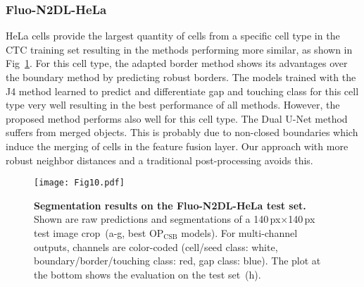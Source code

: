 \documentclass[10pt,letterpaper]{article}
\begin{document}
\subsubsection*{Fluo-N2DL-HeLa}
HeLa cells provide the largest quantity of cells from a specific cell type in the CTC training set resulting in the methods performing more similar, as shown in Fig~\ref{fig:fluo-n2dl-hela-results}. For this cell type, the adapted border method shows its advantages over the boundary method by predicting robust borders. The models trained with the J4 method learned to predict and differentiate gap and touching class for this cell type very well resulting in the best performance of all methods. However, the proposed method performs also well for this cell type. The Dual U-Net method suffers from merged objects. This is probably due to non-closed boundaries which induce the merging of cells in the feature fusion layer. Our approach with more robust neighbor distances and a traditional post-processing avoids this.
\begin{figure}
\begin{adjustwidth}{-2.25in}{0in}
\centering
\texttt{[image: Fig10.pdf]}
\caption{\textbf{Segmentation results on the Fluo-N2DL-HeLa test set.} Shown are raw predictions and segmentations of a 140\,px$\times$140\,px test image crop~(a-g, best $\mathrm{OP}_{\text{CSB}}$ models). For multi-channel outputs, channels are color-coded (cell/seed class: white, boundary/border/touching class: red, gap class: blue). The plot at the bottom shows the evaluation on the test set~(h).}
\label{fig:fluo-n2dl-hela-results}
\end{adjustwidth}
\end{figure}
\end{document}
